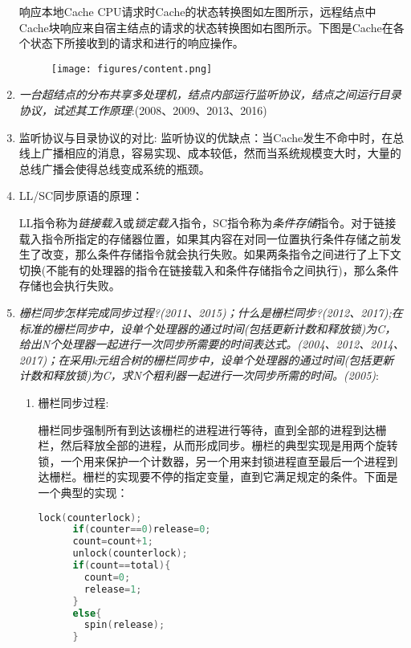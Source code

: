\documentclass[a4paper]{ctexart}
\begin{document}
\begin{enumerate}
  响应本地Cache CPU请求时Cache的状态转换图如左图所示，远程结点中Cache块响应来自宿主结点的请求的状态转换图如右图所示。下图是Cache在各个状态下所接收到的请求和进行的响应操作。
  
  \begin{figure}[htbp]
    \centering
    \texttt{[image: figures/content.png]}
  \end{figure}
  
  \item \emph{一台超结点的分布共享多处理机，结点内部运行监听协议，结点之间运行目录协议，试述其工作原理}:(2008、2009、2013、2016)
  
  
  
  \item 监听协议与目录协议的对比:
  监听协议的优缺点：当Cache发生不命中时，在总线上广播相应的消息，容易实现、成本较低，然而当系统规模变大时，大量的总线广播会使得总线变成系统的瓶颈。
  
  \item LL/SC同步原语的原理：
  
  LL指令称为\emph{链接载入}或\emph{锁定载入}指令，SC指令称为\emph{条件存储}指令。对于链接载入指令所指定的存储器位置，如果其内容在对同一位置执行条件存储之前发生了改变，那么条件存储指令就会执行失败。如果两条指令之间进行了上下文切换(不能有的处理器的指令在链接载入和条件存储指令之间执行)，那么条件存储也会执行失败。
  
  \item \emph{栅栏同步怎样完成同步过程?(2011、2015)；什么是栅栏同步?(2012、2017);在标准的栅栏同步中，设单个处理器的通过时间(包括更新计数和释放锁)为C，给出N个处理器一起进行一次同步所需要的时间表达式。(2004、2012、2014、2017)；在采用k元组合树的栅栏同步中，设单个处理器的通过时间(包括更新计数和释放锁)为C，求N个粗利器一起进行一次同步所需的时间。(2005)}:
  \begin{enumerate}
    \item 栅栏同步过程:
    
    栅栏同步强制所有到达该栅栏的进程进行等待，直到全部的进程到达栅栏，然后释放全部的进程，从而形成同步。栅栏的典型实现是用两个旋转锁，一个用来保护一个计数器，另一个用来封锁进程直至最后一个进程到达栅栏。栅栏的实现要不停的指定变量，直到它满足规定的条件。下面是一个典型的实现：
    \begin {lstlisting}[language=C] 
      lock(counterlock);
      if(counter==0)release=0;
      count=count+1;
      unlock(counterlock);
      if(count==total){
        count=0;
        release=1;
      }
      else{
        spin(release);
      }
    \end{lstlisting}
    

\end{enumerate}
\end{enumerate}
\end{document}
